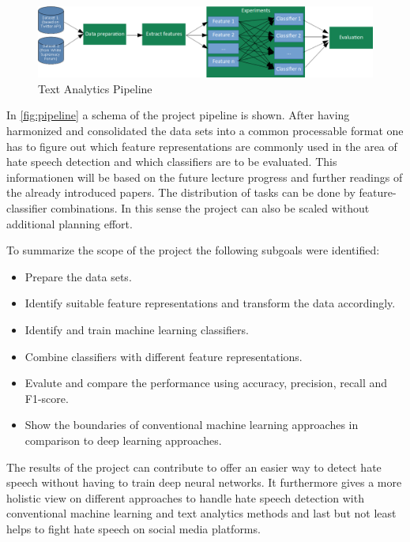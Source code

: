 \begin{figure}[H]
	\centering
	\includegraphics[width=1.0\textwidth]{./pipeline.png}	
	\caption{Text Analytics Pipeline}
	\label{fig:pipeline}
\end{figure}

In \autoref{fig:pipeline} a schema of the project pipeline is shown. After having harmonized and consolidated the data sets into a common processable format one has to figure out which feature representations are commonly used in the area of hate speech detection and which classifiers are to be evaluated. This informationen will be based on the future lecture progress and further readings of the already introduced papers. The distribution of tasks can be done by feature-classifier combinations. In this sense the project can also be scaled without additional planning effort.  

\vspace{12pt}
To summarize the scope of the project the following subgoals were iden\-ti\-fied:

\begin{itemize}
	\item Prepare the data sets.
	\item Identify suitable feature representations and transform the data ac\-cord\-ingly.
	\item Identify and train machine learning classifiers.
	\item Combine classifiers with different feature representations.
	\item Evalute and compare the performance using accuracy, precision, recall and F1-score.
	\item Show the boundaries of conventional machine learning approaches in comparison to deep learning approaches.
\end{itemize}

The results of the project can contribute to offer an easier way to detect hate speech without having to train deep neural networks. It furthermore gives a more holistic view on different approaches to handle hate speech detection with conventional machine learning and text analytics methods and last but not least helps to fight hate speech on social media platforms.

